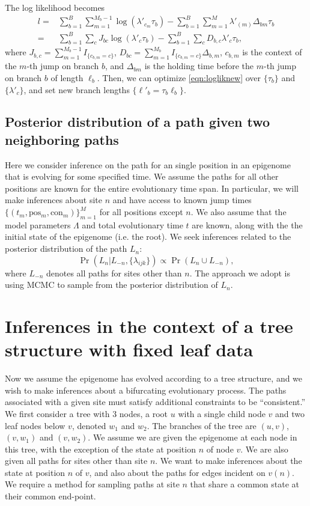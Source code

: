 \documentclass[11pt]{article}
\newcommand{\context}{\ensuremath{\mathrm{con}}}
\newcommand{\psn}{\ensuremath{\mathrm{pos}}}
\begin{document}
The log likelihood becomes
\begin{equation}\label{eqn:logliknew}
  \begin{aligned}
    l = & \sum_{b=1}^B\sum_{m=1}^{M_b-1} \log(\lambda'_{c_m}\tau_b) -  \sum_{b=1}^B\sum_{m=1}^{M} \lambda'_{(m)}\Delta_{bm}\tau_b \\
    = & \sum_{b=1}^B\sum_{c} J_{bc}\log(\lambda'_c\tau_b)  - \sum_{b=1}^B\sum_{c} D_{b,c}\lambda'_c\tau_b ,
  \end{aligned}
\end{equation}
where $J_{b,c} = \sum_{m=1}^{M_b-1}I_{\{c_{b,m}= c\}}$, $D_{bc}
= \sum_{m=1}^{M_b}I_{\{c_{b,m} =c\}}\Delta_{b,m}$, $c_{b,m}$ is
the context of the $m$-th jump on branch $b$, and $\Delta_{bm}$ is the
holding time before the $m$-th jump on branch $b$ of length
$\ell_b$. Then, we can optimize \eqref{eqn:logliknew} over
$\{\tau_b\}$ and $\{\lambda'_c\}$, and set new branch lengths
$\{\ell'_b = \tau_b\ell_b\}$.

\subsection{Posterior distribution of a path given two neighboring paths}

Here we consider inference on the path for an single position in an
epigenome that is evolving for some specified time. We assume the
paths for all other positions are known for the entire evolutionary
time span. In particular, we will make inferences about site $n$ and
have access to known jump times $\{(t_m, \psn{}_m, \context{}_m)
\}_{m=1}^{M}$ for all positions except $n$.
We also assume that the model parameters $\Lambda$ and total
evolutionary time $t$ are known, along with the the initial state of
the epigenome (i.e. the root). We seek inferences related to the
posterior distribution of the path $L_n$:
\[
\Pr(L_n|L_{-n}, \{\lambda_{ijk}\}) \propto \Pr(L_n\cup L_{-n}),
\]
where $L_{-n}$ denotes all paths for sites other than $n$. The
approach we adopt is using MCMC to sample from the posterior
distribution of $L_n$.

\section{Inferences in the context of a tree structure with fixed leaf data}

Now we assume the epigenome has evolved according to a tree structure,
and we wish to make inferences about a bifurcating evolutionary
process. The paths associated with a given site must satisfy
additional constraints to be ``consistent.'' We first consider a tree
with 3 nodes, a root $u$ with a single child node $v$ and two leaf
nodes below $v$, denoted $w_1$ and $w_2$. The branches of the tree are
$(u, v)$, $(v, w_1)$ and $(v, w_2)$. We assume we are given the
epigenome at each node in this tree, with the exception of the state
at position $n$ of node $v$. We are also given all paths for sites
other than site $n$. We want to make inferences about the state at
position $n$ of $v$, and also about the paths for edges incident on
$v(n)$. We require a method for sampling paths at site $n$ that share
a common state at their common end-point.
\end{document}
